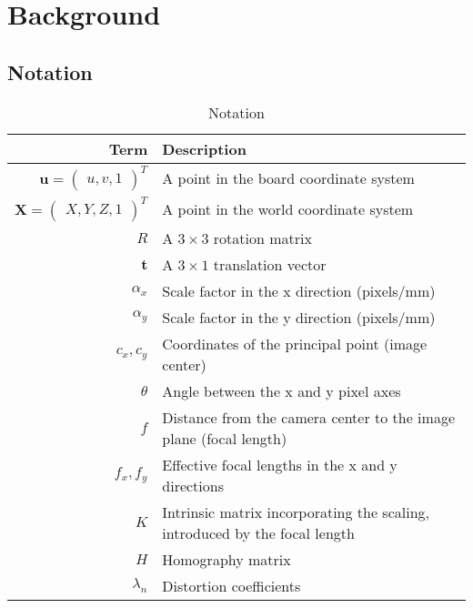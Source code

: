 \chapter{Background}\label{cha:background}

\section{Notation}\label{sec:notation}

\begin{table}[htbp]
	\label{tab:notation}
	\centering
	\begin{tabular}{rl}
		\toprule
		Term                           & Description                                                                \\
		\midrule
		\(\mathbf{u} = \begin{pmatrix}
			               u, v, 1
		               \end{pmatrix}^{T}\) & A point in the board coordinate system                                 \\
		\(\mathbf{X} = \begin{pmatrix}
			               X, Y, Z, 1
		               \end{pmatrix}^{T}\) & A point in the world coordinate system                                 \\
		\(R\)                          & A \(3 \times 3\) rotation matrix                                           \\
		\(\mathbf{t}\)                 & A \(3 \times 1\) translation vector                                        \\
		\(\alpha_x\)                   & Scale factor in the x direction (pixels/mm)                                \\
		\(\alpha_y\)                   & Scale factor in the y direction (pixels/mm)                                \\
		\(c_x, c_y\)                   & Coordinates of the principal point (image center)                          \\
		\(\theta\)                     & Angle between the x and y pixel axes                                       \\
		\(f\)                          & Distance from the camera center to the image plane (focal length)          \\
		\(f_x, f_y\)                   & Effective focal lengths in the x and y directions                          \\
		\(K\)                          & Intrinsic matrix incorporating the scaling, introduced by the focal length \\
		\(H\)                          & Homography matrix                                                          \\
		\(\lambda_n\)                  & Distortion coefficients                                                    \\
		\bottomrule
	\end{tabular}
	\caption{Notation}
\end{table}

